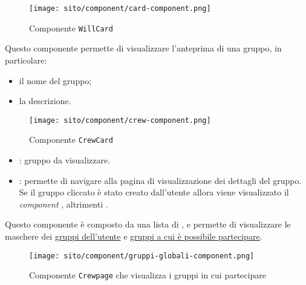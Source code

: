 \begin{figure}[H]
    \centering
    \texttt{[image: sito/component/card-component.png]}
    \caption{Componente \texttt{WillCard}}
\end{figure}

\label{par:CrewCard}
Questo componente permette di visualizzare l'anteprima di una gruppo, in
particolare:
\begin{itemize}
    \item il nome del gruppo;
    \item la descrizione.
\end{itemize}

\begin{figure}[H]
    \centering
    \texttt{[image: sito/component/crew-component.png]}
    \caption{Componente \texttt{CrewCard}}
\end{figure}

\begin{itemize}
    \item {}: gruppo da visualizzare.
\end{itemize}

\begin{itemize}
    \item {}: permette di navigare alla pagina di visualizzazione
          dei dettagli del gruppo. Se il gruppo cliccato è stato creato
          dall'utente
          allora viene visualizzato il \textit{component}
          ,
          altrimenti .
\end{itemize}

\label{par:Crewpage}
Questo componente è composto da una lista di , e permette
di visualizzare le maschere dei \hyperref[par:Gruppi dell'utente]{gruppi
    dell'utente} e \hyperref[par:Gruppi]{gruppi a cui è possibile partecipare}.

\begin{figure}[H]
    \centering
    \texttt{[image: sito/component/gruppi-globali-component.png]}
    \caption{Componente \texttt{Crewpage} che visualizza i gruppi in cui
        partecipare}
\end{figure}


